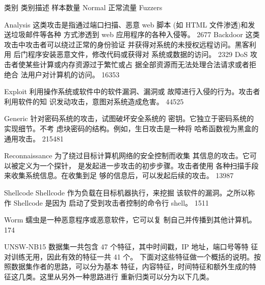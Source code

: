 类别  类别描述  样本数量 
Normal  正常流量   
Fuzzers   
 
Analysis  这类攻击是指通过端口扫描、恶意 web 脚本
(如 HTML 文件渗透)和发送垃圾邮件等各种
方式渗透到 web 应用程序的各种入侵等。 
2677 
Backdoor  这类攻击中攻击者可以绕过正常的身份验证
并获得对系统的未授权远程访问。黑客利用
后门程序安装恶意文件，修改代码或获得对
系统或数据的访问。 
2329 
DoS  攻击者使某些计算或内存资源过于繁忙或占
据全部资源而无法处理合法请求或者拒绝合
法用户对计算机的访问。 
16353 

Exploit  利用操作系统或软件中的软件漏洞、漏洞或
故障进行入侵的行为。攻击者利用软件的知
识发动攻击，意图对系统造成危害。 
44525 

Generic  针对密码系统的攻击，试图破坏安全系统的
密钥。它独立于密码系统的实现细节。不考
虑块密码的结构。例如，生日攻击是一种将
哈希函数视为黑盒的通用攻击。 
215481 

Reconnaissance  为了绕过目标计算机网络的安全控制而收集
其信息的攻击。它可以被定义为一个探针，
是发起进一步攻击的初步步骤。攻击者使用
各种扫描手段来收集系统信息。在收集到足
够的信息后，可以发起后续的攻击。 
13987 

Shellcode  Shellcode 作为负载在目标机器执行，来挖掘
该软件的漏洞。之所以称作 Shellcode 是因为
启动了受到攻击者控制的命令行 shell。 
1511 

Worm  蠕虫是一种恶意程序或恶意软件，它可以复
制自己并传播到其他计算机。 
174 
 
UNSW-NB15 数据集一共包含 47 个特征，其中时间戳，IP 地址，端口号等特
征对训练无用，因此有效的特征一共 41 个。 
下面对这些特征做一个概括的说明。按照数据集作者的思路，可以分为基本
特征，内容特征，时间特征和额外生成的特征这几类。这里从另外一种思路进行
重新归类可以分为以下几类。


